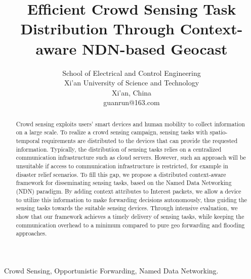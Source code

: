 \documentclass[10pt, conference, compsocconf]{IEEEtran}
\begin{document}

\title{Efﬁcient Crowd Sensing Task Distribution Through Context-aware NDN-based Geocast}

\author
{
	\IEEEauthorblockA
	{
		School of Electrical and Control Engineering\\
		Xi'an University of Science and Technology\\
		Xi'an, China\\
		guanrun@163.com
	}
}

\maketitle

\begin{abstract}
	Crowd sensing exploits users’ smart devices and human mobility to collect information on a large scale. To realize a crowd sensing campaign, sensing tasks with spatio-temporal requirements are distributed to the devices  that  can  provide the requested information. Typically, the distribution of sensing tasks relies on a centralized communication infrastructure such as cloud servers. However, such an approach will be unsuitable if access to communication infrastructure is restricted, for example in disaster relief scenarios. To ﬁll this gap, we propose a distributed context-aware framework for disseminating sensing tasks, based on the Named Data Networking (NDN) paradigm. By adding context attributes to Interest packets, we allow a device to utilize this information to make forwarding decisions autonomously, thus guiding the sensing tasks towards the suitable sensing devices. Through intensive evaluation, we show that our framework achieves a timely delivery of sensing tasks, while keeping the communication overhead to a minimum compared  to pure geo forwarding and ﬂooding approaches.
\end{abstract}

\begin{IEEEkeywords}
	Crowd Sensing, Opportunistic Forwarding, Named Data Networking.
	
\end{IEEEkeywords}

\IEEEpeerreviewmaketitle
\end{document}

